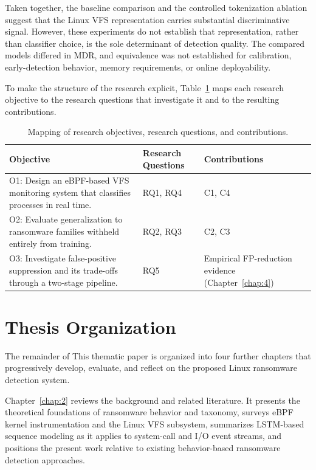 Taken together, the baseline comparison and the controlled tokenization ablation suggest that the Linux VFS representation carries substantial discriminative signal. However, these experiments do not establish that representation, rather than classifier choice, is the sole determinant of detection quality. The compared models differed in MDR, and equivalence was not established for calibration, early-detection behavior, memory requirements, or online deployability.

To make the structure of the research explicit, Table~\ref{tab:1-1} maps each research objective to the research questions that investigate it and to the resulting contributions.

\begin{table}[htbp]
\centering
\small
\caption{Mapping of research objectives, research questions, and contributions.}\label{tab:1-1}
\begin{tabularx}{\textwidth}{XlX}
\hline
\textbf{Objective} & \textbf{Research Questions} & \textbf{Contributions} \\
\hline
O1: Design an eBPF-based VFS monitoring system that classifies processes in real time. & RQ1, RQ4 & C1, C4 \\
O2: Evaluate generalization to ransomware families withheld entirely from training. & RQ2, RQ3 & C2, C3 \\
O3: Investigate false-positive suppression and its trade-offs through a two-stage pipeline. & RQ5 & Empirical FP-reduction evidence (Chapter~\ref{chap:4}) \\
\hline
\end{tabularx}
\end{table}

\section{Thesis Organization}\label{sec:1.6}

The remainder of This thematic paper is organized into four further chapters that progressively develop, evaluate, and reflect on the proposed Linux ransomware detection system.

Chapter~\ref{chap:2} reviews the background and related literature. It presents the theoretical foundations of ransomware behavior and taxonomy, surveys eBPF kernel instrumentation and the Linux VFS subsystem, summarizes LSTM-based sequence modeling as it applies to system-call and I/\allowbreak{}O event streams, and positions the present work relative to existing behavior-based ransomware detection approaches.

